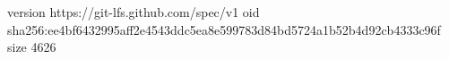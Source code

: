 version https://git-lfs.github.com/spec/v1
oid sha256:ee4bf6432995aff2e4543ddc5ea8e599783d84bd5724a1b52b4d92cb4333c96f
size 4626
